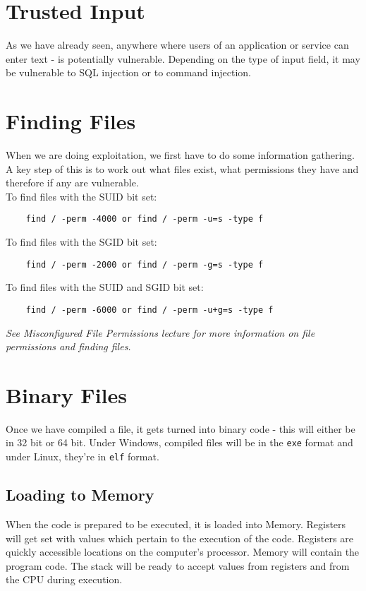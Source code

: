 
\section{Trusted Input}
As we have already seen, anywhere where users of an application or service can enter text - is potentially vulnerable. Depending on the type of input field, it may be vulnerable to SQL injection or to command injection. 

\section{Finding Files}
When we are doing exploitation, we first have to do some information gathering. A key step of this is to work out what files exist, what permissions they have and therefore if any are vulnerable.\\

To find files with the SUID bit set:
\begin{verbatim}
    find / -perm -4000 or find / -perm -u=s -type f
\end{verbatim}
To find files with the SGID bit set:
\begin{verbatim}
    find / -perm -2000 or find / -perm -g=s -type f
\end{verbatim}
To find files with the SUID and SGID bit set:
\begin{verbatim}
    find / -perm -6000 or find / -perm -u+g=s -type f
\end{verbatim}

\textit{See Misconfigured File Permissions lecture for more information on file permissions and finding files.}

\section{Binary Files}
Once we have compiled a file, it gets turned into binary code - this will either be in 32 bit or 64 bit. Under Windows, compiled files will be in the \verb|exe| format and under Linux, they're in \verb|elf| format.

\subsection{Loading to Memory}
When the code is prepared to be executed, it is loaded into Memory. Registers will get set with values which pertain to the execution of the code. Registers are quickly accessible locations on the computer's processor. Memory will contain the program code. The stack will be ready to accept values from registers and from the CPU during execution.\\

